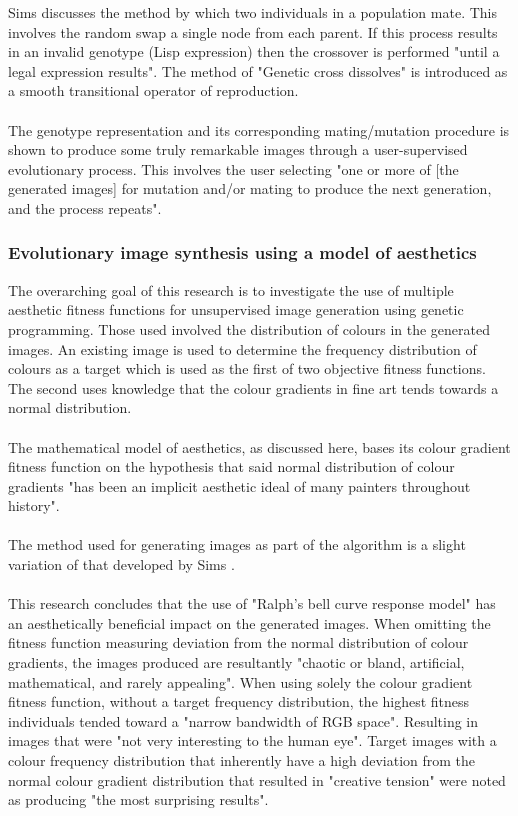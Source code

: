 \documentclass[10pt,a4paper]{article}
\begin{document}
Sims discusses the method by which two individuals in a population mate.
This involves the random swap a single node from each parent.
If this process results in an invalid genotype (Lisp expression) then the crossover is performed "until a legal expression results".
The method of "Genetic cross dissolves" is introduced as a smooth transitional operator of reproduction.
\\\\
The genotype representation and its corresponding mating/mutation procedure is shown to produce some truly remarkable images through a user-supervised evolutionary process.
This involves the user selecting "one or more of [the generated images] for mutation and/or mating to produce the next generation, and the process repeats".

\subsubsection{Evolutionary image synthesis using a model of aesthetics \cite{aesthetic-measures}}

The overarching goal of this research is to investigate the use of multiple aesthetic fitness functions for unsupervised image generation using genetic programming.
Those used involved the distribution of colours in the generated images.
An existing image is used to determine the frequency distribution of colours as a target which is used as the first of two objective fitness functions.
The second uses knowledge that the colour gradients in fine art tends towards a normal distribution.
\\\\
The mathematical model of aesthetics, as discussed here, bases its colour gradient fitness function on the hypothesis that said normal distribution of colour gradients "has been an implicit aesthetic ideal of many painters throughout history".
\\\\
The method used for generating images as part of the algorithm is a slight variation of that developed by Sims \cite{sims}.
\\\\
This research concludes that the use of "Ralph's bell curve response model" has an aesthetically beneficial impact on the generated images.
When omitting the fitness function measuring deviation from the normal distribution of colour gradients, the images produced are resultantly "chaotic or bland, artificial, mathematical, and rarely appealing".
When using solely the colour gradient fitness function, without a target frequency distribution, the highest fitness individuals tended toward a "narrow bandwidth of RGB space".
Resulting in images that were "not very interesting to the human eye".
Target images with a colour frequency distribution that inherently have a high deviation from the normal colour gradient distribution that resulted in "creative tension" were noted as producing "the most surprising results".
\end{document}
